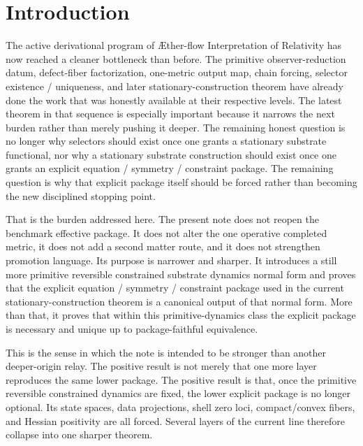 \documentclass[11pt]{article}
\newcommand{\Aflow}{\AE{}ther-flow}
\newcommand{\TheoryName}{\Aflow{} Interpretation of Relativity}
\begin{document}
\section{Introduction}

The active derivational program of \TheoryName{} has now reached a cleaner bottleneck than before. The primitive observer-reduction datum, defect-fiber factorization, one-metric output map, chain forcing, selector existence / uniqueness, and later stationary-construction theorem have already done the work that was honestly available at their respective levels. The latest theorem in that sequence is especially important because it narrows the next burden rather than merely pushing it deeper. The remaining honest question is no longer why selectors should exist once one grants a stationary substrate functional, nor why a stationary substrate construction should exist once one grants an explicit equation / symmetry / constraint package. The remaining question is why that explicit package itself should be forced rather than becoming the new disciplined stopping point.

That is the burden addressed here. The present note does not reopen the benchmark effective package. It does not alter the one operative completed metric, it does not add a second matter route, and it does not strengthen promotion language. Its purpose is narrower and sharper. It introduces a still more primitive reversible constrained substrate dynamics normal form and proves that the explicit equation / symmetry / constraint package used in the current stationary-construction theorem is a canonical output of that normal form. More than that, it proves that within this primitive-dynamics class the explicit package is necessary and unique up to package-faithful equivalence.

This is the sense in which the note is intended to be stronger than another deeper-origin relay. The positive result is not merely that one more layer reproduces the same lower package. The positive result is that, once the primitive reversible constrained dynamics are fixed, the lower explicit package is no longer optional. Its state spaces, data projections, shell zero loci, compact/convex fibers, and Hessian positivity are all forced. Several layers of the current line therefore collapse into one sharper theorem.
\end{document}

